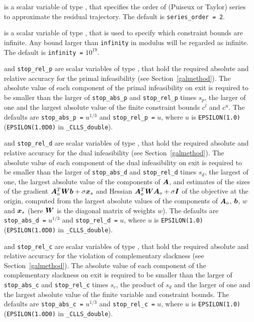 \documentclass{galahad}
\newcommand{\packagename}{CLLS}
\newcommand{\fullpackagename}{\libraryname\_\packagename}
\begin{document}
\begin{description}
 is a scalar variable of type \integer, that
specifies the order of (Puiseux or Taylor) series to approximate the
residual trajectory. The default is {\tt series\_order = 2}.

 is a scalar variable of type \realdp, that is used to
specify which constraint bounds are infinite.
Any bound larger than {\tt infinity} in modulus will be regarded as infinite.
The default is {\tt infinity =} $10^{19}$.

 and {\tt stop\_rel\_p}
are scalar variables of type \realdp, that hold the
required absolute and relative accuracy for the primal infeasibility
(see Section~\ref{galmethod}).
The absolute value of each component of the primal infeasibility
on exit is required to be smaller than the larger of {\tt stop\_abs\_p} and
{\tt stop\_rel\_p} times $s_p$, the larger of one and the largest
absolute value of the finite constraint bounds $c^l$ and $c^u$.
The defaults are {\tt stop\_abs\_p =} $u^{1/3}$ and
{\tt stop\_rel\_p =} $u$,
where $u$ is {\tt EPSILON(1.0)} ({\tt EPSILON(1.0D0)} in
{\tt \fullpackagename\_double}).

 and {\tt stop\_rel\_d}
are scalar variables of type \realdp, that hold the
required absolute and relative accuracy for the dual infeasibility
(see Section~\ref{galmethod}).
The absolute value of each component of the dual infeasibility
on exit is required to be smaller than the larger of {\tt stop\_abs\_d} and
{\tt stop\_rel\_d} times $s_d$, the largest of one, the largest absolute
value of the components of ${\bm{A}}$, and estimates of the sizes of the
gradient ${\bm{A}}_o^T {\bm{W}} {\bm{b}} + \sigma {\bm{x}}_s$ and Hessian
${\bm{A}}_o^T {\bm{W}} {\bm{A}}_o + \sigma {\bm{I}}$ of the objective at the origin,
computed from the largest absolute values of the components of ${\bm{A}}_o$,
${\bm{b}}$, $w$ and ${\bm{x}}_s$ (here ${\bm{W}}$ is the diagonal matrix of weights $w$).
The defaults are {\tt stop\_abs\_d =} $u^{1/3}$ and
{\tt stop\_rel\_d =} $u$,
where $u$ is {\tt EPSILON(1.0)} ({\tt EPSILON(1.0D0)} in
{\tt \fullpackagename\_double}).

 and {\tt stop\_rel\_c}
are scalar variables of type \realdp, that hold the
required absolute and relative accuracy
for the violation of complementary slackness
(see Section~\ref{galmethod}).
The absolute value of each component of the complementary slackness
on exit is required to be smaller than the larger of {\tt stop\_abs\_c} and
{\tt stop\_rel\_c} times $s_c$, the product of $s_d$ and the larger of
one and the largest absolute value of the finite variable and constraint
bounds.
The defaults are {\tt stop\_abs\_c =} $u^{1/3}$ and
{\tt stop\_rel\_c =} $u$,
where $u$ is {\tt EPSILON(1.0)} ({\tt EPSILON(1.0D0)} in
{\tt \fullpackagename\_double}).


\end{description}
\end{document}
